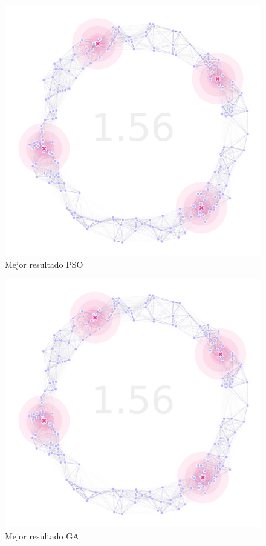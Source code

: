   \begin{figure}[ht!]
    \centering
    \includegraphics[width=\textwidth]{pso-best.png}
    \caption{Mejor resultado PSO}
    \label{fig:pso-best}
  \end{figure}

  \begin{figure}[ht!]
    \centering
    \includegraphics[width=\textwidth]{ga-best.png}
    \caption{Mejor resultado GA}
    \label{fig:ga-best}
  \end{figure}

